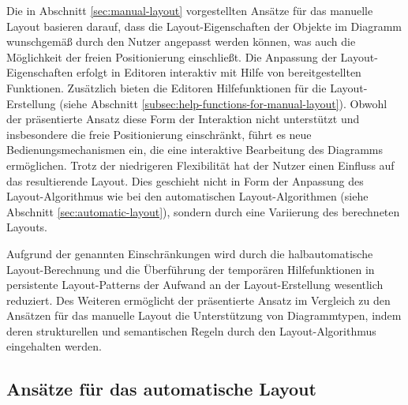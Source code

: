 Die in Abschnitt \ref{sec:manual-layout} vorgestellten Ansätze für das manuelle Layout basieren darauf, dass die Layout-Eigenschaften der Objekte im Diagramm wunschgemäß durch den Nutzer angepasst werden können, was auch die Möglichkeit der freien Positionierung einschließt. Die Anpassung der Layout-Eigenschaften erfolgt in Editoren interaktiv mit Hilfe von bereitgestellten Funktionen. Zusätzlich bieten die Editoren Hilfefunktionen für die Layout-Erstellung (siehe Abschnitt \ref{subsec:help-functions-for-manual-layout}). Obwohl der präsentierte Ansatz diese Form der Interaktion nicht unterstützt und insbesondere die freie Positionierung einschränkt, führt es neue Bedienungsmechanismen ein, die eine interaktive Bearbeitung des Diagramms ermöglichen. Trotz der niedrigeren Flexibilität hat der Nutzer einen Einfluss auf das resultierende Layout. Dies geschieht nicht in Form der Anpassung des Layout-Algorithmus wie bei den automatischen Layout-Algorithmen (siehe Abschnitt \ref{sec:automatic-layout}), sondern durch eine Variierung des berechneten Layouts.

Aufgrund der genannten Einschränkungen wird durch die halbautomatische Layout-Berechnung und die Überführung der temporären Hilfefunktionen in persistente Layout-Patterns der Aufwand an der Layout-Erstellung wesentlich reduziert. Des Weiteren ermöglicht der präsentierte Ansatz im Vergleich zu den Ansätzen für das manuelle Layout die Unterstützung von Diagrammtypen, indem deren strukturellen und semantischen Regeln durch den Layout-Algorithmus eingehalten werden.

\subsection{Ansätze für das automatische Layout}
\label{subsec:comparison-automatic-layout}

